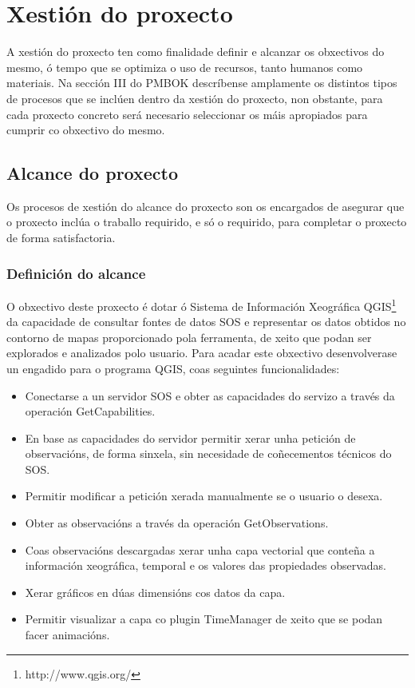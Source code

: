 \chapter{Xestión do proxecto}
A xestión do proxecto ten como finalidade definir e alcanzar os obxectivos do mesmo, ó tempo que se optimiza o uso de recursos, tanto humanos como materiais. Na sección III do PMBOK\cite{PMBOK} descríbense amplamente os distintos tipos de procesos que se inclúen dentro da xestión do proxecto, non obstante, para cada proxecto concreto será necesario seleccionar os máis apropiados para cumprir co obxectivo do mesmo.

\section{Alcance do proxecto}
Os procesos de xestión do alcance do proxecto son os encargados de asegurar que o proxecto inclúa o traballo requirido, e só o requirido, para completar o proxecto de forma satisfactoria.

\subsection{Definición do alcance}
O obxectivo deste proxecto é dotar ó Sistema de Información Xeográfica QGIS\footnote{http://www.qgis.org/} da capacidade de consultar fontes de datos SOS e representar os datos obtidos no contorno de mapas proporcionado pola ferramenta, de xeito que podan ser explorados e analizados polo usuario. Para acadar este obxectivo desenvolverase un engadido para o programa QGIS, coas seguintes funcionalidades:

\begin{itemize}
\item Conectarse a un servidor SOS e obter as capacidades do servizo a través da operación GetCapabilities.
\item En base as capacidades do servidor permitir xerar unha petición de observacións, de forma sinxela, sin necesidade de coñecementos técnicos do SOS.
\item Permitir modificar a petición xerada manualmente se o usuario o desexa.
\item Obter as observacións a través da operación GetObservations.
\item Coas observacións descargadas xerar unha capa vectorial que conteña a información xeográfica, temporal e os valores das propiedades observadas.
\item Xerar gráficos en dúas dimensións cos datos da capa.
\item Permitir visualizar a capa co plugin TimeManager de xeito que se podan facer animacións.
\end{itemize}

